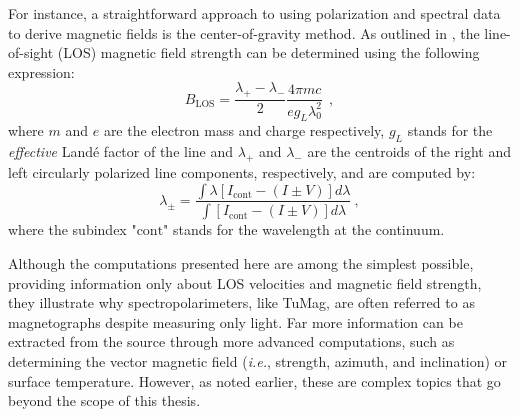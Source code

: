 For instance, a straightforward approach to using polarization and spectral data to derive magnetic fields is the center-of-gravity method. As outlined in \cite{utien}, the line-of-sight (LOS) magnetic field strength can be determined using the following expression:
\begin{equation}
  B_{\text{LOS}} = \frac{\lambda _ {+} - \lambda _ -}{2}\frac{4\pi m c}{eg_{L}\lambda_0 ^2}\ \ ,
  \label{eq_spectro: Blos-cog}
\end{equation}  
where $m$ and $e$ are the electron mass and charge respectively, $g_L$ stands for the \emph{effective} Landé factor of the line and $\lambda _ {+}$ and $\lambda _ {-}$ are the centroids of the right and left circularly polarized line components, respectively, and are computed by:
\begin{equation}
  \lambda _ {\pm} = \frac{\int \lambda \left[I_{\text{cont}} - (I \pm V)\right]d\lambda}{\int \left[I_{\text{cont}} - (I \pm V)\right]d\lambda} \ ,
  \label{eq_spectro: lambda_plus_minus}
\end{equation} 
where the subindex "$\text{cont}$" stands for the wavelength at the continuum. 

Although the computations presented here are among the simplest possible, providing information only about LOS velocities and magnetic field strength, they illustrate why spectropolarimeters, like TuMag, are often referred to as magnetographs despite measuring only light. Far more information can be extracted from the source through more advanced computations, such as determining the vector magnetic field (\textit{i.e.}, strength, azimuth, and inclination) or surface temperature. However, as noted earlier, these are complex topics that go beyond the scope of this thesis.